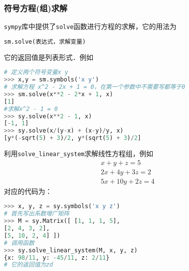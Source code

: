 \subsubsection{符号方程(组)求解}
\verb|sympy|库中提供了\verb|solve|函数进行方程的求解，它的用法为
\begin{lstlisting}[language=python]
sm.solve(表达式，求解变量)
\end{lstlisting}
它的返回值是列表形式．例如
\begin{lstlisting}[language=python]
# 定义两个符号变量x y
>>> x,y = sm.symbols('x y')
# 求解方程 x^2 - 2x + 1 = 0，在第一个参数中不需要写都等于0
>>> sm.solve(x**2 - 2*x + 1, x)
[1] 
#求解x^2 - 1 = 0
>>> sy.solve(x**2 - 1, x)
[-1, 1]
>>> sy.solve(x/(y-x) + (x-y)/y, x)
[y*(-sqrt(5) + 3)/2, y*(sqrt(5) + 3)/2]
\end{lstlisting}
利用\verb|solve_linear_system|求解线性方程组，例如
\begin{align}
x+y+z=5 \\
2 x+4 y+3 z=2 \\
5 x+10 y+2 z=4
\end{align}
对应的代码为：
\begin{lstlisting}[language=python]
>>> x, y, z = sy.symbols('x y z')
# 首先写出系数增广矩阵
>>> M = sy.Matrix([ [1, 1, 1, 5],
[2, 4, 3, 2],
[5, 10, 2, 4] ])
# 调用函数
>>> sy.solve_linear_system(M, x, y, z)
{x: 98/11, y: -45/11, z: 2/11}
# 它的返回值为zd
\end{lstlisting}